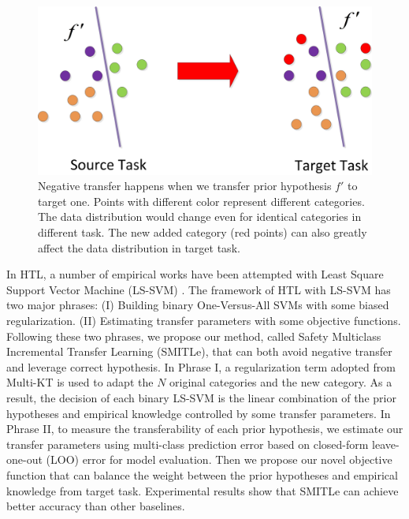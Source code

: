 \begin{figure}
\centering
\includegraphics[scale=.4]{fig/domain.jpg}
\caption{Negative transfer happens when we transfer prior hypothesis $f'$ to target one. Points with different color represent different categories. The data distribution would change even for identical categories in different task. The new added category (red points) can also greatly affect the data distribution in target task. }\label{fig:distribution}
\end{figure}
In HTL, a number of empirical works have been attempted with Least Square Support Vector Machine (LS-SVM) \cite{kuzborskij2013stability}. 
The framework of HTL with LS-SVM has two major phrases: (I) Building binary One-Versus-All SVMs with some biased regularization. (II) Estimating transfer parameters with some objective functions.
Following these two phrases, we propose our method, called Safety Multiclass Incremental Transfer Learning (SMITLe), that can both avoid negative transfer and leverage correct hypothesis. In Phrase I, a regularization term adopted from Multi-KT \cite{tommasi2014learning} is used to adapt the $N$ original categories and the new category. As a result, the decision of each binary LS-SVM is the linear combination of the prior hypotheses and empirical knowledge controlled by some transfer parameters. In Phrase II, to measure the transferability of each prior hypothesis, we estimate our transfer parameters using multi-class prediction error based on closed-form leave-one-out (LOO) error for model evaluation.
Then we propose our novel objective function that can balance the weight between the prior hypotheses and empirical knowledge from target task. Experimental results show that SMITLe can achieve better accuracy than other baselines.

